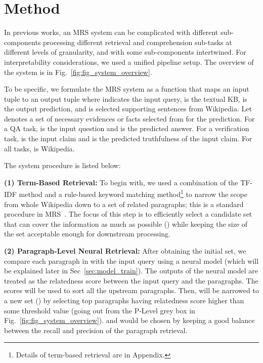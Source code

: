 \documentclass[11pt,a4paper]{article}
\begin{document}
\section{Method}
\label{sec:system_setup}
In previous works, an MRS system can be complicated with different sub-components processing different retrieval and comprehension sub-tasks at different levels of granularity, and with some sub-components intertwined. For interpretability considerations, we used a unified pipeline setup. The overview of the system is in Fig.~\ref{fig:fig_system_overview}.

To be specific, we formulate the MRS system as a function that maps an input tuple  to an output tuple  where  indicates the input query,  is the textual KB,  is the output prediction, and  is selected supporting sentences from Wikipedia. Let  denotes a set of necessary evidences or facts selected from  for the prediction. For a QA task,  is the input question and  is the predicted answer. For a verification task,  is the input claim and  is the predicted truthfulness of the input claim. For all tasks,  is Wikipedia.

The system procedure is listed below:

\noindent\textbf{(1) Term-Based Retrieval:} To begin with, we used a combination of the TF-IDF method and a rule-based keyword matching method\footnote{Details of term-based retrieval are in Appendix.} to narrow the scope from whole Wikipedia down to a set of related paragraphs; this is a standard procedure in MRS~\cite{chen2017drqa, lee2018ranking, nie2019combining}. The focus of this step is to efficiently select a candidate set  that can cover the information as much as possible () while keeping the size of the set acceptable enough for downstream processing.

\noindent\textbf{(2) Paragraph-Level Neural Retrieval:} After obtaining the initial set, we compare each paragraph in  with the input query  using a neural model (which will be explained later in Sec~\ref{sec:model_train}).
The outputs of the neural model are treated as the relatedness score between the input query and the paragraphs. The scores will be used to sort all the upstream paragraphs. Then,  will be narrowed to a new set  () by selecting top  paragraphs having relatedness score higher than some threshold value  (going out from the P-Level grey box in Fig.~\ref{fig:fig_system_overview}).  and  would be chosen by keeping a good balance between the recall and precision of the paragraph retrieval.
\end{document}
